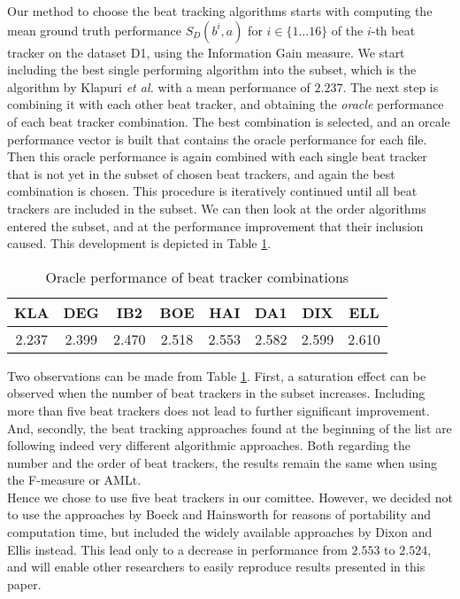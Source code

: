 \documentclass[10pt,journal,final,twocolumn,twoside]{IEEEtran}
\begin{document}
Our method to choose the beat tracking algorithms starts with computing the mean ground truth performance $S_D(b^i,a)$ for $i \in \lbrace 1 \dots 16 \rbrace$ of the $i$-th beat tracker on the dataset D1, using the Information Gain measure. We start including the best single performing algorithm into the subset, which is the algorithm by Klapuri \textit{et al.} \cite{KlapuriIEEE06} with a mean performance of $2.237$. The next step is combining it with each other beat tracker, and obtaining the \textit{oracle} performance of each beat tracker combination. The best combination is selected, and an orcale performance vector is built that contains the oracle performance for each file. Then this oracle performance is again combined with each single beat tracker that is not yet in the subset of chosen beat trackers, and again the best combination is chosen. This procedure is iteratively continued until all beat trackers are included in the subset. We can then look at the order algorithms entered the subset, and at the performance improvement that their inclusion caused. This development is depicted in Table \ref{tab:BT_oracle}.

\begin{table}[h!tb]
\caption{Oracle performance of beat tracker combinations} \label{tab:BT_oracle}
\begin{center}
\begin{tabular}{|c|c|c|c|c|c|c|c|}\hline
KLA & DEG & IB2 & BOE & HAI & DA1 & DIX & ELL  \\ \hline
2.237 &   2.399 &   2.470 &   2.518 &   2.553 &   2.582  &  2.599 &   2.610   \\ \hline 
\end{tabular}
\end{center}
\end{table}

Two observations can be made from Table \ref{tab:BT_oracle}. First, a saturation effect can be observed when the number of beat trackers in the subset increases.  Including more than five beat trackers does not lead to further significant improvement. And, secondly, the beat tracking approaches found at the beginning of the list are following indeed very different algorithmic approaches. Both regarding the number and the order of beat trackers, the results remain the same when using the F-measure or AMLt.\\
Hence we chose to use five beat trackers in our comittee. However, we decided not to use the approaches by Boeck \cite{Boeck} and Hainsworth \cite{Hains} for reasons of portability and computation time, but included the widely available approaches by Dixon \cite{Dixon} and Ellis \cite{Ellis} instead. This lead only to a decrease in performance from $2.553$ to $2.524$, and will enable other researchers to easily reproduce results presented in this paper.
\end{document}
